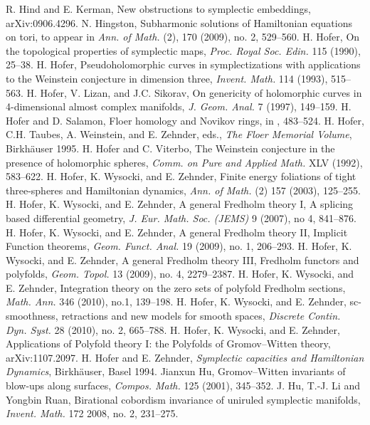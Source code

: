  R. Hind and E. Kerman, New obstructions to symplectic embeddings, arXiv:0906.4296.
 N. Hingston, Subharmonic solutions of Hamiltonian equations on tori, to appear in \emph{Ann. of Math.} (2), 170 (2009), no. 2, 529--560.
 H. Hofer, On the topological properties of symplectic maps, \emph{Proc. Royal Soc. Edin.} 115 (1990), 25--38.
 H. Hofer, Pseudoholomorphic curves in symplectizations with applications to the Weinstein conjecture in dimension three, \emph{Invent. Math.} 114 (1993), 515--563.
 H. Hofer, V. Lizan, and J.C. Sikorav, On genericity of holomorphic curves in 4-dimensional almost complex manifolds, \emph{J. Geom. Anal.} 7 (1997), 149--159.
 H. Hofer and D. Salamon, Floer homology and Novikov rings, in \cite{src-181}, 483--524.
 H. Hofer, C.H. Taubes, A. Weinstein, and E. Zehnder, eds., \emph{The Floer Memorial Volume}, Birkh\"auser 1995.
 H. Hofer and C. Viterbo, The Weinstein conjecture in the presence of holomorphic spheres, \emph{Comm. on Pure and Applied Math.} XLV (1992), 583--622.
 H. Hofer, K. Wysocki, and E. Zehnder, Finite energy foliations of tight three-spheres and Hamiltonian dynamics, \emph{Ann. of Math.} (2) 157 (2003), 125--255.
 H. Hofer, K. Wysocki, and E. Zehnder, A general Fredholm theory I, A splicing based differential geometry, \emph{J. Eur. Math. Soc. (JEMS)} 9 (2007), no 4, 841--876.
 H. Hofer, K. Wysocki, and E. Zehnder, A general Fredholm theory II, Implicit Function theorems, \emph{Geom. Funct. Anal.} 19 (2009), no. 1, 206--293.
 H. Hofer, K. Wysocki, and E. Zehnder, A general Fredholm theory III, Fredholm functors and polyfolds, \emph{Geom. Topol.} 13 (2009), no. 4, 2279--2387.
 H. Hofer, K. Wysocki, and E. Zehnder, Integration theory on the zero sets of polyfold Fredholm sections, \emph{Math. Ann.} 346 (2010), no.1, 139--198.
 H. Hofer, K. Wysocki, and E. Zehnder, sc-smoothness, retractions and new models for smooth spaces, \emph{Discrete Contin. Dyn. Syst.} 28 (2010), no. 2, 665--788.
 H. Hofer, K. Wysocki, and E. Zehnder, Applications of Polyfold theory I: the Polyfolds of Gromov--Witten theory, arXiv:1107.2097.
 H. Hofer and E. Zehnder, \emph{Symplectic capacities and Hamiltonian Dynamics}, Birkh\"auser, Basel 1994.
 Jianxun Hu, Gromov--Witten invariants of blow-ups along surfaces, \emph{Compos. Math.} 125 (2001), 345--352.
 J. Hu, T.-J. Li and Yongbin Ruan, Birational cobordism invariance of uniruled symplectic manifolds, \emph{Invent. Math.} 172 2008, no. 2, 231--275.
